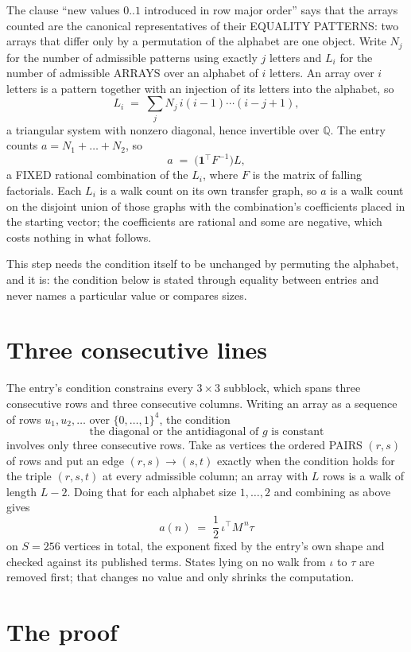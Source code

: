 \documentclass[11pt,a4paper]{article}
\theoremstyle{plain}
\theoremstyle{definition}
\begin{document}
The clause ``new values $0..1$ introduced in row major order'' says that the arrays
counted are the canonical representatives of their EQUALITY PATTERNS: two arrays that differ
only by a permutation of the alphabet are one object. Write $N_j$ for the number of admissible
patterns using exactly $j$ letters and $L_i$ for the number of admissible ARRAYS over an
alphabet of $i$ letters. An array over $i$ letters is a pattern together with an injection of
its letters into the alphabet, so
\[
L_i\;=\;\sum_{j}N_j\,i(i-1)\cdots(i-j+1),
\]
a triangular system with nonzero diagonal, hence invertible over $\mathbb{Q}$. The entry
counts $a=N_1+\dots+N_{2}$, so
\[
a\;=\;\bigl(\mathbf{1}^{\!\top}F^{-1}\bigr)L ,
\]
a FIXED rational combination of the $L_i$, where $F$ is the matrix of falling factorials.
Each $L_i$ is a walk count on its own transfer graph, so $a$ is a walk count on the disjoint
union of those graphs with the combination's coefficients placed in the starting vector; the
coefficients are rational and some are negative, which costs nothing in what follows.

This step needs the condition itself to be unchanged by permuting the alphabet, and it is:
the condition below is stated through equality between entries and never names a particular
value or compares sizes.

\section{Three consecutive lines}

The entry's condition constrains every $3\times3$ subblock, which spans three consecutive
rows and three consecutive columns. Writing an array as a sequence of rows
$u_1,u_2,\dots$ over $\{0,\dots,1\}^{4}$, the condition
\[
\text{the diagonal or the antidiagonal of }g\text{ is constant}
\]
involves only three consecutive rows. Take as vertices the ordered PAIRS $(r,s)$ of
rows and put an edge $(r,s)\to(s,t)$ exactly when the condition holds for the triple
$(r,s,t)$ at every admissible column; an array with $L$ rows is a walk of length $L-2$.
Doing that for each alphabet size $1,\dots,2$ and combining as above gives
\[
a(n)\;=\;\frac{1}{2}\,\iota^{\!\top}M^{\,n}\tau
\]
on $S=256$ vertices in total, the exponent fixed by the entry's own shape and checked against
its published terms. States lying on no walk from $\iota$ to $\tau$ are removed first; that
changes no value and only shrinks the computation.

\section{The proof}
\end{document}
